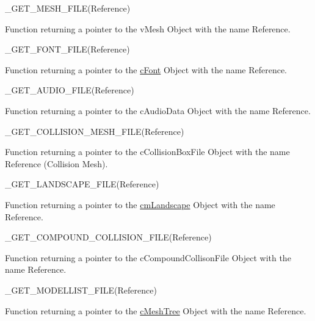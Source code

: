 \begin{DoxyItemize}
\begin{DoxyItemize}
\end{DoxyItemize}
\item \_\-GET\_\-MESH\_\-FILE(Reference)
\begin{DoxyItemize}
\item Function returning a pointer to the vMesh Object with the name Reference.
\end{DoxyItemize}
\item \_\-GET\_\-FONT\_\-FILE(Reference)
\begin{DoxyItemize}
\item Function returning a pointer to the \hyperlink{classc_font}{cFont} Object with the name Reference.
\end{DoxyItemize}
\item \_\-GET\_\-AUDIO\_\-FILE(Reference)
\begin{DoxyItemize}
\item Function returning a pointer to the cAudioData Object with the name Reference.
\end{DoxyItemize}
\item \_\-GET\_\-COLLISION\_\-MESH\_\-FILE(Reference)
\begin{DoxyItemize}
\item Function returning a pointer to the cCollisionBoxFile Object with the name Reference (Collision Mesh).
\end{DoxyItemize}
\item \_\-GET\_\-LANDSCAPE\_\-FILE(Reference)
\begin{DoxyItemize}
\item Function returning a pointer to the \hyperlink{classcm_landscape}{cmLandscape} Object with the name Reference.
\end{DoxyItemize}
\end{DoxyItemize}
\begin{DoxyItemize}
\item \_\-GET\_\-COMPOUND\_\-COLLISION\_\-FILE(Reference)
\begin{DoxyItemize}
\item Function returning a pointer to the cCompoundCollisonFile Object with the name Reference.
\end{DoxyItemize}
\end{DoxyItemize}
\begin{DoxyItemize}
\item \_\-GET\_\-MODELLIST\_\-FILE(Reference)
\begin{DoxyItemize}
\item Function returning a pointer to the \hyperlink{classc_mesh_tree}{cMeshTree} Object with the name Reference.
\end{DoxyItemize}
\end{DoxyItemize}
